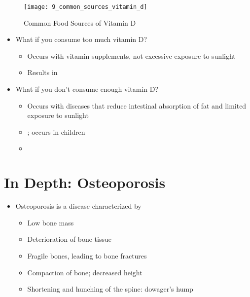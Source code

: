 \documentclass[title={Chapter 9}]{fdsn201notes}
\begin{document}
\begin{figure}[H]
	\centering
	\texttt{[image: 9\_common\_sources\_vitamin\_d]}
	\caption{Common Food Sources of Vitamin D}
	\label{fig:common-sources-vitamin-d}
\end{figure}

\begin{itemize}
	\item What if you consume too much vitamin D?
	\begin{itemize}
		\item Occurs with vitamin supplements, not excessive exposure to sunlight
		\item Results in 
	\end{itemize}
	\item What if you don’t consume enough vitamin D?
	\begin{itemize}
		\item Occurs with diseases that reduce intestinal absorption of fat and limited exposure to sunlight
		\item {}; occurs in children
		\item {}
	\end{itemize}
\end{itemize}


\section{In Depth: Osteoporosis}\label{sec:in-depth:-osteoporosis}
\begin{itemize}
	\item Osteoporosis is a disease characterized by
	\begin{itemize}
		\item Low bone mass
		\item Deterioration of bone tissue
		\item Fragile bones, leading to bone fractures
		\item Compaction of bone; decreased height
		\item Shortening and hunching of the spine: dowager’s hump
	\end{itemize}
\end{itemize}
\end{document}

